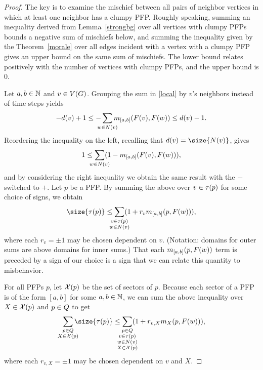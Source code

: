 \begin{proof}
The key is to examine the mischief between all pairs of neighbor vertices in
which at least one neighbor has a clumpy PFP. Roughly speaking, summing an
inequality derived from Lemma~\ref{strongbg} over all vertices with clumpy PFPs
bounds a negative sum of mischiefs below, and summing the inequality given by
the Theorem~\ref{morale} over all edges incident with a vertex with a clumpy
PFP gives an upper bound on the same sum of mischiefs. The lower bound relates
positively with the number of vertices with clumpy PFPs, and the upper bound is
0.

Let $a,b \in \mathbb{N}$ and $v \in V(G)$. Grouping the sum in \eqref{local} by $v$'s
neighbors instead of time steps yields
\[
  -\deg{v} + 1 \leq -\smashoperator{\sum_{w \in
      \N{v}}}\misb{[a,b]}{\pfp{v}}{\pfp{w}} \leq \deg{v} - 1.
\]
Reordering the inequality on the left, recalling that $\deg{v} = \size{\N{v}}$,
gives
\[
  1 \leq \smashoperator{\sum_{w \in \N{v}}}(1 - \misb{[a,b]}{\pfp{v}}{\pfp{w}}),
\]
and by considering the right inequality we obtain the same result with the $-$
switched to $+$. Let $p$ be a PFP. By summing the above over $v \in
\pfpverts{p}$ for some choice of signs, we obtain
\[
  \size{\pfpverts{p}} \leq \smashoperator{\sum_{\substack{v \in \pfpverts{p}
        \\ w \in \N{v}}}}(1 + r_v\misb{[a,b]}{p}{\pfp{w}}),
\]
where each $r_v = \pm1$ may be chosen dependent on $v$. (Notation: domains for
outer sums are above domains for inner sums.) That each
$\misb{[a,b]}{p}{\pfp{w}}$ term is preceded by a sign of our choice is a sign
that we can relate this quantity to misbehavior.

For all PFPs $p$, let $\mathcal{X}(p)$ be the set of sectors of $p$. Because each
sector of a PFP is of the form $[a,b]$ for some $a,b \in \mathbb{N}$, we can sum the
above inequality over $X \in \mathcal{X}(p)$ and $p \in \cpfps$ to get
\begin{equation}\label{almost}
  \smashoperator[r]{\sum_{\substack{
        p \in \cpfps \\
        X \in \sctr{p}
  }}}\size{\pfpverts{p}} \leq
  \smashoperator{\sum_{\substack{
        p \in \cpfps \\ v \in \pfpverts{p} \\
        w \in \N{v} \\ X \in \sctr{p}
  }}}(1 + r_{v,X}\misb{X}{p}{\pfp{w}}),
\end{equation}
where each $r_{v,X} = \pm1$ may be chosen dependent on $v$ and $X$.


\end{proof}

